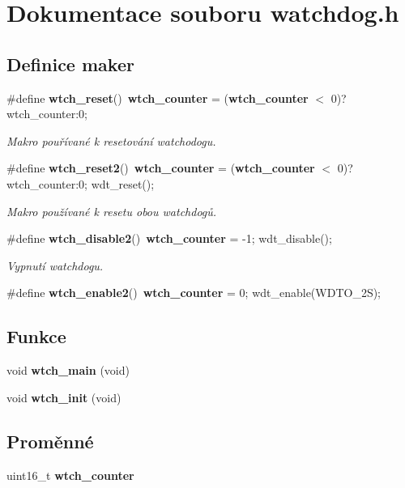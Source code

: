 \section{Dokumentace souboru watchdog.h}
\label{watchdog_8h}
\subsection*{Definice maker}
\begin{DoxyCompactItemize}
\item 
\#define {\bf wtch\_\-reset}()~{\bf wtch\_\-counter} = ({\bf wtch\_\-counter} $<$ 0)?wtch\_\-counter:0;
\begin{DoxyCompactList}\small\item\em Makro pouřívané k resetování watchodogu. \item\end{DoxyCompactList}\item 
\#define {\bf wtch\_\-reset2}()~{\bf wtch\_\-counter} = ({\bf wtch\_\-counter} $<$ 0)? wtch\_\-counter:0; wdt\_\-reset();
\begin{DoxyCompactList}\small\item\em Makro používané k resetu obou watchdogů. \item\end{DoxyCompactList}\item 
\#define {\bf wtch\_\-disable2}()~{\bf wtch\_\-counter} = -\/1; wdt\_\-disable();
\begin{DoxyCompactList}\small\item\em Vypnutí watchdogu. \item\end{DoxyCompactList}\item 
\#define {\bf wtch\_\-enable2}()~{\bf wtch\_\-counter} = 0; wdt\_\-enable(WDTO\_\-2S);
\end{DoxyCompactItemize}
\subsection*{Funkce}
\begin{DoxyCompactItemize}
\item 
void {\bf wtch\_\-main} (void)
\item 
void {\bf wtch\_\-init} (void)
\end{DoxyCompactItemize}
\subsection*{Proměnné}
\begin{DoxyCompactItemize}
\item 
uint16\_\-t {\bf wtch\_\-counter}
\end{DoxyCompactItemize}


